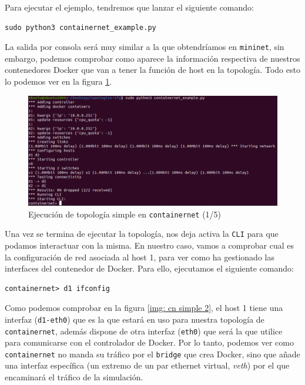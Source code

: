 \documentclass[12pt]{article}
\begin{document}
	\noindent Para ejecutar el ejemplo, tendremos que lanzar el siguiente comando:
	\begin{verbatim}
sudo python3 containernet_example.py
	\end{verbatim}

	\noindent La salida por consola será muy similar a la que obtendríamos en \texttt{mininet}, sin embargo, podemos comprobar como aparece la información respectiva de nuestros contenedores Docker que van a tener la función de host en la topología. Todo esto lo podemos ver en la figura \ref{img: cn simple 1}.
	
	\begin{figure}[h!]
		\begin{center}
			\includegraphics[width=1\textwidth]{img/cn_example1.png}
			\caption{Ejecución de topología simple en \texttt{containernet} (1/5)}
			\label{img: cn simple 1}
		\end{center}
	\end{figure}

	\noindent Una vez se termina de ejecutar la topología, nos deja activa la \texttt{CLI} para que podamos interactuar con la misma. En nuestro caso, vamos a comprobar cual es la configuración de red asociada al host 1, para ver como ha gestionado las interfaces del contenedor de Docker. Para ello, ejecutamos el siguiente comando:
	\begin{verbatim}
containernet> d1 ifconfig
	\end{verbatim}

	\noindent Como podemos comprobar en la figura \ref{img: cn simple 2}, el host 1 tiene una interfaz (\texttt{d1-eth0}) que es la que estará en uso para nuestra topología de \texttt{containernet}, además dispone de otra interfaz (\texttt{eth0}) que será la que utilice para comunicarse con el controlador de Docker. Por lo tanto, podemos ver como \texttt{containernet} no manda su tráfico por el \texttt{bridge} que crea Docker, sino que añade una interfaz específica (un extremo de un par ethernet virtual, \textit{veth}) por el que encaminará el tráfico de la simulación.
\end{document}
